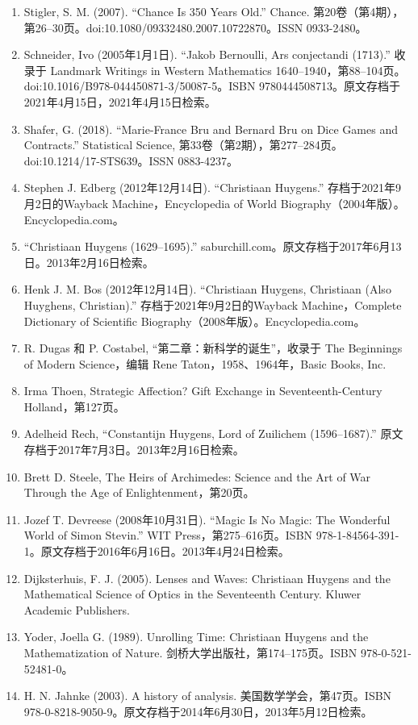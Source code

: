 \begin{enumerate}
\item Stigler, S. M. (2007). “Chance Is 350 Years Old.” Chance. 第20卷（第4期），第26–30页。doi:10.1080/09332480.2007.10722870。ISSN 0933-2480。
\item Schneider, Ivo (2005年1月1日). “Jakob Bernoulli, Ars conjectandi (1713).” 收录于 Landmark Writings in Western Mathematics 1640–1940，第88–104页。doi:10.1016/B978-044450871-3/50087-5。ISBN 9780444508713。原文存档于2021年4月15日，2021年4月15日检索。
\item Shafer, G. (2018). “Marie-France Bru and Bernard Bru on Dice Games and Contracts.” Statistical Science, 第33卷（第2期），第277–284页。doi:10.1214/17-STS639。ISSN 0883-4237。
\item Stephen J. Edberg (2012年12月14日). “Christiaan Huygens.” 存档于2021年9月2日的Wayback Machine，Encyclopedia of World Biography（2004年版）。Encyclopedia.com。
\item “Christiaan Huygens (1629–1695).” saburchill.com。原文存档于2017年6月13日。2013年2月16日检索。
\item Henk J. M. Bos (2012年12月14日). “Christiaan Huygens, Christiaan (Also Huyghens, Christian).” 存档于2021年9月2日的Wayback Machine，Complete Dictionary of Scientific Biography（2008年版）。Encyclopedia.com。
\item R. Dugas 和 P. Costabel, “第二章：新科学的诞生”，收录于 The Beginnings of Modern Science，编辑 Rene Taton，1958、1964年，Basic Books, Inc.
\item Irma Thoen, Strategic Affection? Gift Exchange in Seventeenth-Century Holland，第127页。
\item Adelheid Rech, “Constantijn Huygens, Lord of Zuilichem (1596–1687).” 原文存档于2017年7月3日。2013年2月16日检索。
\item Brett D. Steele, The Heirs of Archimedes: Science and the Art of War Through the Age of Enlightenment，第20页。
\item Jozef T. Devreese (2008年10月31日). “Magic Is No Magic: The Wonderful World of Simon Stevin.” WIT Press，第275–616页。ISBN 978-1-84564-391-1。原文存档于2016年6月16日。2013年4月24日检索。
\item Dijksterhuis, F. J. (2005). Lenses and Waves: Christiaan Huygens and the Mathematical Science of Optics in the Seventeenth Century. Kluwer Academic Publishers.
\item Yoder, Joella G. (1989). Unrolling Time: Christiaan Huygens and the Mathematization of Nature. 剑桥大学出版社，第174–175页。ISBN 978-0-521-52481-0。
\item H. N. Jahnke (2003). A history of analysis. 美国数学学会，第47页。ISBN 978-0-8218-9050-9。原文存档于2014年6月30日，2013年5月12日检索。

\end{enumerate}
